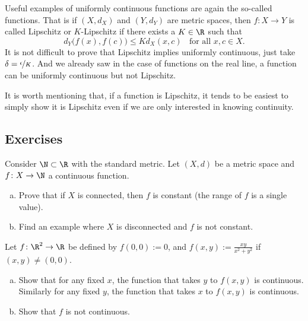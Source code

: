 \documentclass[12pt]{book}
\begin{document}
\begin{example}
Useful examples of uniformly continuous functions are again the so-called
\emph{} functions.
That is if
$(X,d_X)$ and $(Y,d_Y)$ are metric spaces, then $f \colon X \to Y$
is called Lipschitz or $K$-Lipschitz if there exists a $K \in \R$ such that
\begin{equation*}
d_Y\bigl(f(x),f(c)\bigr) \leq K d_X(x,c)
\ \ \ \ \text{for all } x,c \in X.
\end{equation*}
It is not difficult to prove that Lipschitz implies uniformly continuous,
just take $\delta = \nicefrac{\epsilon}{K}$.
And we already saw in the case
of functions on the real line, a function can be uniformly continuous
but not Lipschitz.

It is worth mentioning that,
if a function is Lipschitz, it tends to be
easiest to simply show it is Lipschitz even if we are only
interested in knowing continuity.
\end{example}

\subsection*{Exercises}

\begin{exercise}
Consider $\N \subset \R$ with the standard metric.  
Let $(X,d)$ be a metric space and $f \colon X \to \N$ a continuous function.  
\begin{enumerate}[a)]
 \item Prove that
if $X$ is connected, then $f$ is constant (the range of $f$ is a single
value).
 \item Find an example where $X$ is disconnected and $f$ is not constant.
\end{enumerate}
\end{exercise}

\begin{exercise}
Let $f \colon \R^2 \to \R$ be defined by $f(0,0) := 0$, and $f(x,y) := \frac{xy}{x^2+y^2}$ if $(x,y) \not= (0,0)$.  
\begin{enumerate}[a)]
 \item Show that for any fixed $x$,
the function that takes $y$ to $f(x,y)$ is continuous.
Similarly
for any fixed $y$, the function that takes $x$ to $f(x,y)$ is continuous.
 \item Show that $f$ is not continuous.
\end{enumerate}
\end{exercise}
\end{document}
